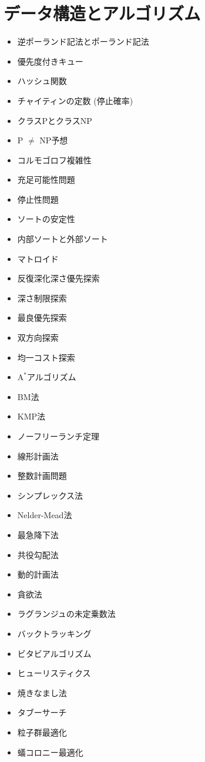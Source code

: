 \documentclass[a4j, titlepage, 11pt]{jsarticle}
\begin{document}
\section{データ構造とアルゴリズム}
\begin{multicols}{2}
\begin{itemize}
	\item 逆ポーランド記法とポーランド記法
	\item 優先度付きキュー
	\item ハッシュ関数
	\item チャイティンの定数 (停止確率)
	\item クラスPとクラスNP
	\item P $\neq$ NP予想
	\item コルモゴロフ複雑性
	\item 充足可能性問題
	\item 停止性問題
	\item ソートの安定性
	\item 内部ソートと外部ソート
	\item マトロイド
	\item 反復深化深さ優先探索
	\item 深さ制限探索
	\item 最良優先探索
	\item 双方向探索
	\item 均一コスト探索
	\item $\mathrm{A}^{*}$アルゴリズム
	\item BM法
	\item KMP法
	\item ノーフリーランチ定理
	\item 線形計画法
	\item 整数計画問題
	\item シンプレックス法
	\item Nelder-Mead法
	\item 最急降下法
	\item 共役勾配法
	\item 動的計画法
	\item 貪欲法
	\item ラグランジュの未定乗数法
	\item バックトラッキング
	\item ビタビアルゴリズム
	\item ヒューリスティクス
	\item 焼きなまし法
	\item タブーサーチ
	\item 粒子群最適化
	\item 蟻コロニー最適化

\end{itemize}
\end{multicols}
\end{document}
